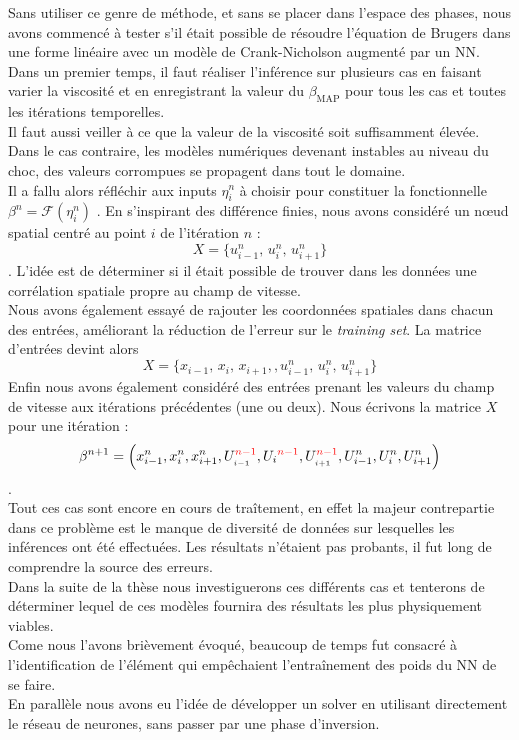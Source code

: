 \documentclass[a4paper,12pt]{article}
\newcommand{\bepar}[1]{
	\left( #1 \right)  
}
\newcommand{\bmap}{\beta_{\text{MAP}}}
\newcommand\bk{\color{black}}
\newcommand\red{\color{red}}
\numberwithin{equation}{section} %
\begin{document}
\noindent Sans utiliser ce genre de méthode, et sans se placer dans l'espace des phases, nous avons commencé à tester s'il était possible de résoudre l'équation de Brugers dans une forme linéaire avec un modèle de Crank-Nicholson augmenté par un NN.\\
Dans un premier temps, il faut réaliser l'inférence sur plusieurs cas en faisant varier la viscosité et en enregistrant la valeur du $\bmap$ pour tous les cas et toutes les itérations temporelles. \\
Il faut aussi veiller à ce que la valeur de la viscosité soit suffisamment élevée. Dans le cas contraire, les modèles numériques devenant instables au niveau du choc, des valeurs corrompues se propagent dans tout le domaine.\\

\noindent Il a fallu alors réfléchir aux inputs $\eta_i^n$ à choisir pour constituer la fonctionnelle $\beta^n = \mathcal{F}\bepar{\eta_i^n}$ . En s'inspirant des différence finies, nous avons considéré un nœud spatial centré au point $i$ de l'itération $n$ : $$X = \{ u^n_{i-1},\, u^n_{i},\, u^n_{i+1}\}$$. L'idée est de déterminer si il était possible de trouver dans les données une corrélation spatiale propre au champ de vitesse.\\
Nous avons également essayé de rajouter les coordonnées spatiales dans chacun des entrées, améliorant la réduction de l'erreur sur le \textit{training set}. La matrice d'entrées devint alors $$X = \{ x_{i-1}, \, x_i,\, x_{i+1},, u^n_{i-1},\, u^n_{i},\, u^n_{i+1}\}$$
Enfin nous avons également considéré des entrées prenant les valeurs du champ de vitesse aux itérations précédentes (une ou deux). Nous écrivons la matrice $X$ pour une itération : $$ \beta^{n+1} = \bepar{x_{i-1}^n, x_i^n, x^n_{i+1}, U_{_{\bk i-1}}^{\red n-1}, U_{\bk i}^{\red n-1}, U_{_{\bk i+1}}^{\red n-1}, U_{i-1}^n, U_i^n, U^n_{i+1}} $$.\\
Tout ces cas sont encore en cours de traîtement, en effet la majeur contrepartie dans ce problème est le manque de diversité de données sur lesquelles les inférences ont été effectuées. Les résultats n'étaient pas probants, il fut long de comprendre la source des erreurs. \\
Dans la suite de la thèse nous investiguerons ces différents cas et tenterons de déterminer lequel de ces modèles fournira des résultats les plus physiquement viables.\\

\noindent Come nous l'avons brièvement évoqué, beaucoup de temps fut consacré à l'identification de l'élément qui empêchaient l'entraînement des poids du NN de se faire.\\
En parallèle nous avons eu l'idée de développer un solver en utilisant directement le réseau de neurones, sans passer par une phase d'inversion.\\
\end{document}
